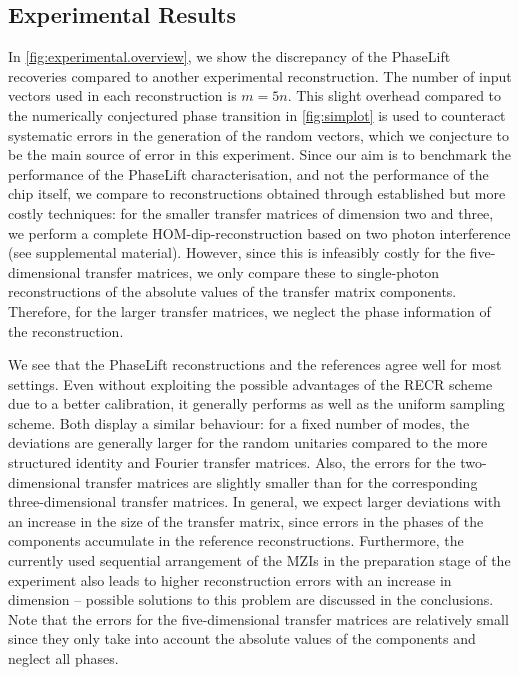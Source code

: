 \subsection{Experimental Results}
In \cref{fig:experimental.overview}, we show the discrepancy of the PhaseLift recoveries compared to another experimental reconstruction.
The number of input vectors used in each reconstruction is $m = 5n$.
This slight overhead compared to the numerically conjectured phase transition in \cref{fig:simplot} is used to counteract systematic errors in the generation of the random vectors, which we conjecture to be the main source of error in this experiment.
Since our aim is to benchmark the performance of the PhaseLift characterisation, and not the performance of the chip itself, we compare to reconstructions obtained through established but more costly techniques: for the smaller transfer matrices of dimension two and three, we perform a complete HOM-dip-reconstruction based on two photon interference (see supplemental material).
However, since this is infeasibly costly for the five-dimensional transfer matrices, we only compare these to single-photon reconstructions of the absolute values of the transfer matrix components.
Therefore, for the larger transfer matrices, we neglect the phase information of the reconstruction.

We see that the PhaseLift reconstructions and the references agree well for most settings.
Even without exploiting the possible advantages of the RECR scheme due to a better calibration, it generally performs as well as the uniform sampling scheme.
Both display a similar behaviour: for a fixed number of modes, the deviations are generally larger for the random unitaries compared to the more structured identity and Fourier transfer matrices.
Also, the errors for the two-dimensional transfer matrices are slightly smaller than for the corresponding three-dimensional transfer matrices.
In general, we expect larger deviations with an increase in the size of the transfer matrix, since errors in the phases of the components accumulate in the reference reconstructions.
Furthermore, the currently used sequential arrangement of the MZIs in the preparation stage of the experiment also leads to higher reconstruction errors with an increase in dimension -- possible solutions to this problem are discussed in the conclusions.
Note that the errors for the five-dimensional transfer matrices are relatively small since they only take into account the absolute values of the components and neglect all phases.

